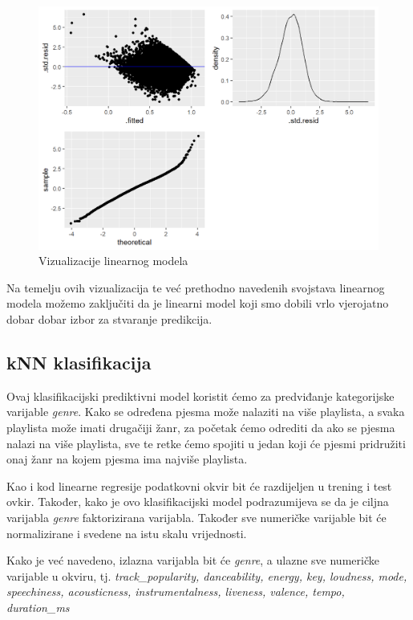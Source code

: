 	\begin{figure}[H]
		\includegraphics[scale=0.9]{slike/predikcije.png}
		\centering
		\caption{Vizualizacije linearnog modela}
		
	\end{figure}
	
	Na temelju ovih vizualizacija te već prethodno navedenih svojstava linearnog modela možemo zaključiti da je linearni model koji smo dobili vrlo vjerojatno dobar dobar izbor za stvaranje predikcija. 
	
	\subsection{kNN klasifikacija}
	
	Ovaj klasifikacijski prediktivni model koristit ćemo za predviđanje kategorijske varijable \textit{genre}. Kako se određena pjesma može nalaziti na više playlista, a svaka playlista može imati drugačiji žanr, za početak ćemo odrediti da ako se pjesma nalazi na više playlista, sve te retke ćemo spojiti u jedan koji će pjesmi pridružiti onaj žanr na kojem pjesma ima najviše playlista. 
	
	Kao i kod linearne regresije podatkovni okvir bit će razdijeljen u trening i test ovkir. Također, kako je ovo klasifikacijski model podrazumijeva se da je ciljna varijabla \textit{genre} faktorizirana varijabla. Također sve numeričke varijable bit će normalizirane i svedene na istu skalu vrijednosti. 
	
	Kako je već navedeno, izlazna varijabla bit će \textit{genre}, a ulazne sve numeričke varijable u okviru, tj. \textit{track\_popularity, danceability, energy, key, loudness, mode, speechiness, acousticness, instrumentalness, liveness, valence, tempo, duration\_ms}
	
